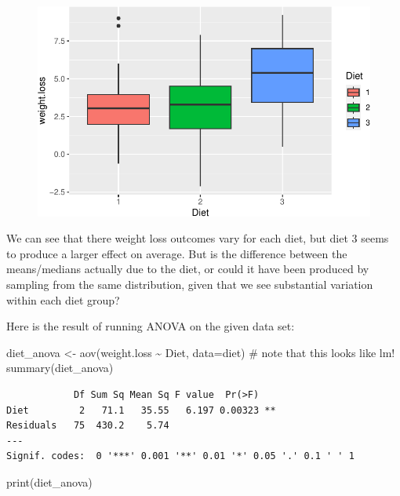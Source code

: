 \documentclass[
  letterpaper,
  DIV=11,
  numbers=noendperiod]{scrreprt}
\newenvironment{Shaded}{\begin{snugshade}}{\end{snugshade}}
\newcommand{\AttributeTok}[1]{\textcolor[rgb]{0.40,0.45,0.13}{#1}}
\newcommand{\CommentTok}[1]{\textcolor[rgb]{0.37,0.37,0.37}{#1}}
\newcommand{\FunctionTok}[1]{\textcolor[rgb]{0.28,0.35,0.67}{#1}}
\newcommand{\NormalTok}[1]{\textcolor[rgb]{0.00,0.23,0.31}{#1}}
\newcommand{\OtherTok}[1]{\textcolor[rgb]{0.00,0.23,0.31}{#1}}
\newcommand{\SpecialCharTok}[1]{\textcolor[rgb]{0.37,0.37,0.37}{#1}}
\begin{document}
\begin{figure}[H]

{\centering \includegraphics{./09-ANOVA_files/figure-pdf/unnamed-chunk-3-1.pdf}

}

\end{figure}

We can see that there weight loss outcomes vary for each diet, but diet
3 seems to produce a larger effect on average. But is the difference
between the means/medians actually due to the diet, or could it have
been produced by sampling from the same distribution, given that we see
substantial variation within each diet group?

Here is the result of running ANOVA on the given data set:

\begin{Shaded}
\begin{Highlighting}[]
\NormalTok{diet\_anova  }\OtherTok{\textless{}{-}}  \FunctionTok{aov}\NormalTok{(weight.loss }\SpecialCharTok{\textasciitilde{}}\NormalTok{ Diet, }\AttributeTok{data=}\NormalTok{diet) }\CommentTok{\# note that this looks like lm!}
\FunctionTok{summary}\NormalTok{(diet\_anova)}
\end{Highlighting}
\end{Shaded}

\begin{verbatim}
            Df Sum Sq Mean Sq F value  Pr(>F)   
Diet         2   71.1   35.55   6.197 0.00323 **
Residuals   75  430.2    5.74                   
---
Signif. codes:  0 '***' 0.001 '**' 0.01 '*' 0.05 '.' 0.1 ' ' 1
\end{verbatim}

\begin{Shaded}
\begin{Highlighting}[]
\FunctionTok{print}\NormalTok{(diet\_anova)}
\end{Highlighting}
\end{Shaded}
\end{document}
